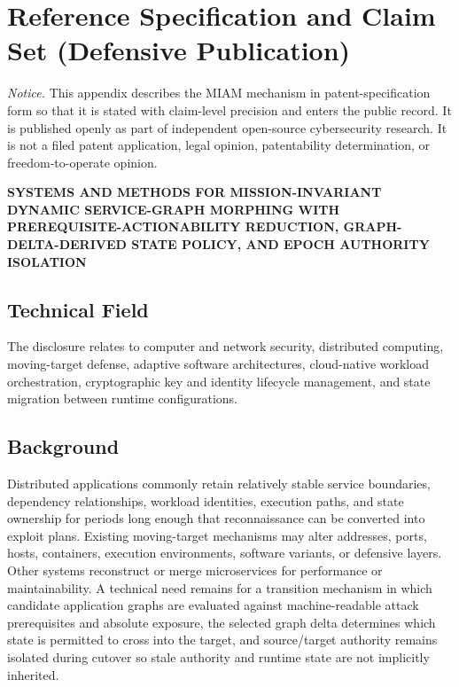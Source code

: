 \documentclass[11pt,letterpaper]{article}
\begin{document}
\section{Reference Specification and Claim Set (Defensive Publication)}

\noindent\emph{Notice.} This appendix describes the MIAM mechanism in patent-specification form so that it is stated with claim-level precision and enters the public record. It is published openly as part of independent open-source cybersecurity research. It is not a filed patent application, legal opinion, patentability determination, or freedom-to-operate opinion.

\begin{center}
\bfseries SYSTEMS AND METHODS FOR MISSION-INVARIANT DYNAMIC SERVICE-GRAPH MORPHING WITH PREREQUISITE-ACTIONABILITY REDUCTION, GRAPH-DELTA-DERIVED STATE POLICY, AND EPOCH AUTHORITY ISOLATION
\end{center}

\subsection{Technical Field}

The disclosure relates to computer and network security, distributed computing, moving-target defense, adaptive software architectures, cloud-native workload orchestration, cryptographic key and identity lifecycle management, and state migration between runtime configurations.

\subsection{Background}

Distributed applications commonly retain relatively stable service boundaries, dependency relationships, workload identities, execution paths, and state ownership for periods long enough that reconnaissance can be converted into exploit plans. Existing moving-target mechanisms may alter addresses, ports, hosts, containers, execution environments, software variants, or defensive layers. Other systems reconstruct or merge microservices for performance or maintainability. A technical need remains for a transition mechanism in which candidate application graphs are evaluated against machine-readable attack prerequisites and absolute exposure, the selected graph delta determines which state is permitted to cross into the target, and source/target authority remains isolated during cutover so stale authority and runtime state are not implicitly inherited.
\end{document}

